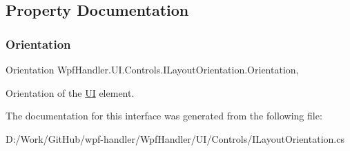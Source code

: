\subsection{Property Documentation}
\mbox{\label{interface_wpf_handler_1_1_u_i_1_1_controls_1_1_i_layout_orientation_ae6ef94c906753022926767578498721a}} 
\subsubsection{\texorpdfstring{Orientation}{Orientation}}
{\footnotesize\ttfamily Orientation Wpf\+Handler.\+U\+I.\+Controls.\+I\+Layout\+Orientation.\+Orientation\hspace{0.3cm}{\ttfamily [get]}, {\ttfamily [set]}}



Orientation of the \mbox{\hyperlink{namespace_wpf_handler_1_1_u_i}{UI}} element. 



The documentation for this interface was generated from the following file\+:\begin{DoxyCompactItemize}
\item 
D\+:/\+Work/\+Git\+Hub/wpf-\/handler/\+Wpf\+Handler/\+U\+I/\+Controls/I\+Layout\+Orientation.\+cs\end{DoxyCompactItemize}
